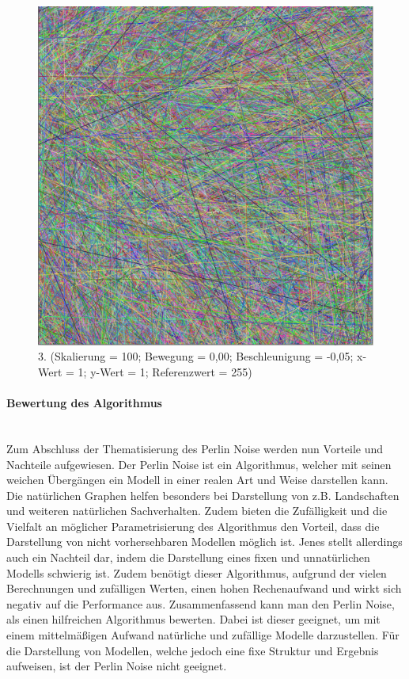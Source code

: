 \documentclass[../mciAusarbeitung.tex]{subfiles}
\begin{document}
   \begin{figure}[H]
\centering
\includegraphics[width=0.5\linewidth]{"Perlin_Skalierung100_xuy1.png"}
\caption[Perlin Noise-Beispiel3]{3. (Skalierung = 100; Bewegung = 0,00; Beschleunigung = -0,05; x-Wert = 1; y-Wert = 1; Referenzwert = 255)}
\end{figure}           
           
            \paragraph{Bewertung des Algorithmus}$~$ \\
            Zum Abschluss der Thematisierung des Perlin Noise werden nun Vorteile und Nachteile aufgewiesen. Der Perlin Noise ist ein Algorithmus, welcher mit seinen weichen Übergängen ein Modell in einer realen Art und Weise darstellen kann. Die natürlichen Graphen helfen besonders bei Darstellung von z.B. Landschaften und weiteren natürlichen Sachverhalten. Zudem bieten die Zufälligkeit und die Vielfalt an möglicher Parametrisierung des Algorithmus den Vorteil, dass die Darstellung von nicht vorhersehbaren Modellen möglich ist.
            Jenes stellt allerdings auch ein Nachteil dar, indem die Darstellung eines fixen und unnatürlichen Modells schwierig ist. Zudem benötigt dieser Algorithmus, aufgrund der vielen Berechnungen und zufälligen Werten, einen hohen Rechenaufwand und wirkt sich negativ auf die Performance aus. 
            Zusammenfassend kann man den Perlin Noise, als einen hilfreichen Algorithmus bewerten. Dabei ist dieser geeignet, um mit einem mittelmäßigen Aufwand natürliche und zufällige Modelle darzustellen. Für die Darstellung von Modellen, welche jedoch eine fixe Struktur und Ergebnis aufweisen, ist der Perlin Noise nicht geeignet.
            
\end{document}
